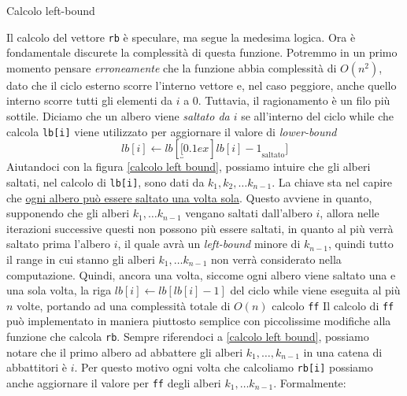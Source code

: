 \begin{algoritmo*}{Calcolo left-bound}
	\begin{algorithm}[H]
	\end{algorithm}
\end{algoritmo*}
Il calcolo del vettore \verb|rb| è speculare, ma segue la medesima logica.
\vskip3mm
Ora è fondamentale discurete la complessità di questa funzione. Potremmo in un primo momento pensare \textit{erroneamente} che la funzione abbia complessità di $ O\left(n^2 \right) $, dato che il ciclo esterno scorre l'interno vettore e, nel caso peggiore, anche quello interno scorre tutti gli elementi da $ i $ a 0. Tuttavia, il ragionamento è un filo più sottile.
\vskip3mm
Diciamo che un albero viene \textit{saltato da $ i $} se all'interno del ciclo while che calcola \verb|lb[i]| viene utilizzato per aggiornare il valore di \textit{lower-bound}
\[
	lb[i] \leftarrow lb[\underbracket[0.1ex]{lb[i] - 1}_{\text{saltato}}]
\]
Aiutandoci con la figura \ref{calcolo left bound}, possiamo intuire che gli alberi saltati, nel calcolo di \verb|lb[i]|, sono dati da $ k_1, k_2, \ldots k_{n-1} $. La chiave sta nel capire che \underline{ogni albero può essere saltato una volta sola}. Questo avviene in quanto, supponendo che gli alberi $ k_1,\ldots k_{n - 1} $ vengano saltati dall'albero $ i $, allora nelle iterazioni successive questi non possono più essere saltati, in quanto al più verrà saltato prima l'albero $ i $, il quale avrà un \textit{left-bound} minore di $ k_{n-1} $, quindi tutto il range in cui stanno gli alberi $ k_1,\ldots k_{n-1} $ non verrà considerato nella computazione.
\vskip3mm
Quindi, ancora una volta, siccome ogni albero viene saltato una e una sola volta, la riga $ 	lb[i] \leftarrow lb[lb[i] - 1]$ del ciclo while viene eseguita al più $ n $ volte, portando ad una complessità totale di $ O\left(n\right) $
\vskip3mm
\hypertarget{taglialegna step 2}{} calcolo \verb|ff|
\vskip3mm
Il calcolo di \verb|ff| può implementato in maniera piuttosto semplice con piccolissime modifiche alla funzione che calcola \verb|rb|. Sempre riferendoci a \cref{calcolo left bound}, possiamo notare che il primo albero ad abbattere gli alberi $ k_1,\ldots ,k_{n-1} $ in una catena di abbattitori è $ i $. Per questo motivo ogni volta che calcoliamo \verb|rb[i]| possiamo anche aggiornare il valore per \verb|ff| degli alberi $ k_1,\ldots k_{n-1} $. Formalmente:
